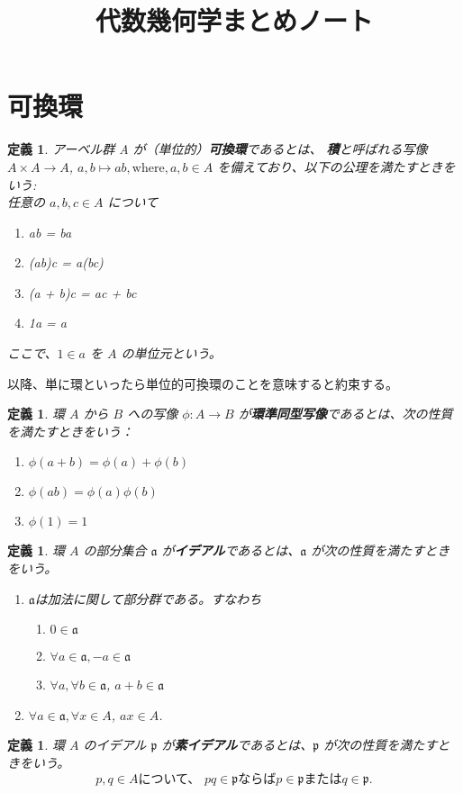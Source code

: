 \documentclass[uplatex]{jsreport}
\title{代数幾何学まとめノート}
\date{}
\newtheorem{dfn}[thm]{定義}
\newcommand{\mfa}{\mathfrak{a}}
\newcommand{\mfp}{\mathfrak{p}}
\begin{document}
\maketitle

\section{可換環}
\begin{dfn}
アーベル群 A が（単位的）\textbf{可換環}であるとは、
\textbf{積}と呼ばれる写像 $A \times A \to A$, $a, b \mapsto ab, \text{where}, a, b \in A$
を備えており、以下の公理を満たすときをいう: \\

任意の $a, b, c \in A$ について
\begin{enumerate}
    \item ab = ba
    \item (ab)c = a(bc)
    \item (a + b)c = ac + bc
    \item 1a = a
\end{enumerate}
ここで、$1 \in a$ を $A$ の単位元という。
\end{dfn}
以降、単に環といったら単位的可換環のことを意味すると約束する。

\begin{dfn}
    環 $A$ から $B$ への写像 $\phi: A \to B$ が\textbf{環準同型写像}であるとは、次の性質を満たすときをいう：
    \begin{enumerate}
        \item $\phi(a + b) = \phi(a) + \phi(b)$
        \item $\phi(ab) = \phi(a)\phi(b)$
        \item $\phi(1) = 1$
    \end{enumerate}
\end{dfn}

\begin{dfn}
    環 $A$ の部分集合 $\mfa$ が\textbf{イデアル}であるとは、$\mfa$ が次の性質を満たすときをいう。
    \begin{enumerate}
        \item $\mfa$は加法に関して部分群である。すなわち
        \begin{enumerate}
            \item $0 \in \mfa$
            \item $\forall a \in \mfa, -a \in \mfa$
            \item $\forall a, \forall b \in \mfa$, $a + b \in \mfa$
        \end{enumerate}
        \item $\forall a \in \mfa, \forall x \in A$, $ax \in A$.
    \end{enumerate}
\end{dfn}

\begin{dfn}
    環 $A$ のイデアル $\mfp$ が\textbf{素イデアル}であるとは、$\mfp$ が次の性質を満たすときをいう。
    \[
        p, q \in A \text{について、\ } pq \in \mfp \text{ならば} p \in \mfp \text{または} q \in \mfp.
    \]
\end{dfn}
\end{document}
